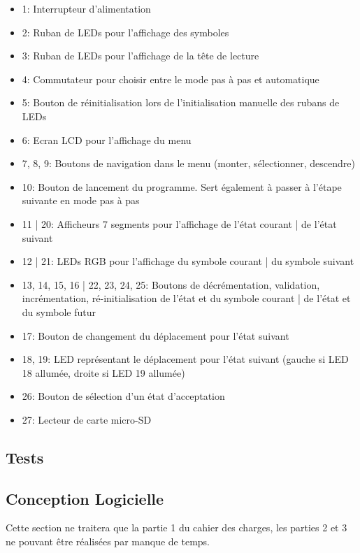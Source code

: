 \documentclass[12pt]{report}
\begin{document}
	\begin{itemize}[label=$-$]
		\item 1: Interrupteur d'alimentation
		\item 2: Ruban de LEDs pour l'affichage des symboles
		\item 3: Ruban de LEDs pour l'affichage de la tête de lecture
		\item 4: Commutateur pour choisir entre le mode pas à pas et automatique
		\item 5: Bouton de réinitialisation lors de l'initialisation manuelle des rubans de LEDs
		\item 6: Ecran LCD pour l'affichage du menu
		\item 7, 8, 9: Boutons de navigation dans le menu (monter, sélectionner, descendre)
		\item 10: Bouton de lancement du programme. Sert également à passer à l'étape suivante en mode pas à pas
		\item 11 | 20: Afficheurs 7 segments pour l'affichage de l'état courant | de l'état suivant
		\item 12 | 21: LEDs RGB pour l'affichage du symbole courant | du symbole suivant
		\item 13, 14, 15, 16 | 22, 23, 24, 25: Boutons de décrémentation, validation, incrémentation, ré-initialisation de l'état et du symbole courant | de l'état et du symbole futur
		\item 17: Bouton de changement du déplacement pour l'état suivant
		\item 18, 19: LED représentant le déplacement pour l'état suivant (gauche si LED 18 allumée, droite si LED 19 allumée)
		\item 26: Bouton de sélection d'un état d'acceptation
		\item 27: Lecteur de carte micro-SD
	\end{itemize}
	\subsection{Tests}
	\subsection{Conception Logicielle}
	Cette section ne traitera que la partie 1 du cahier des charges, les parties 2 et 3 ne pouvant être réalisées par manque de temps.\\
\end{document}
